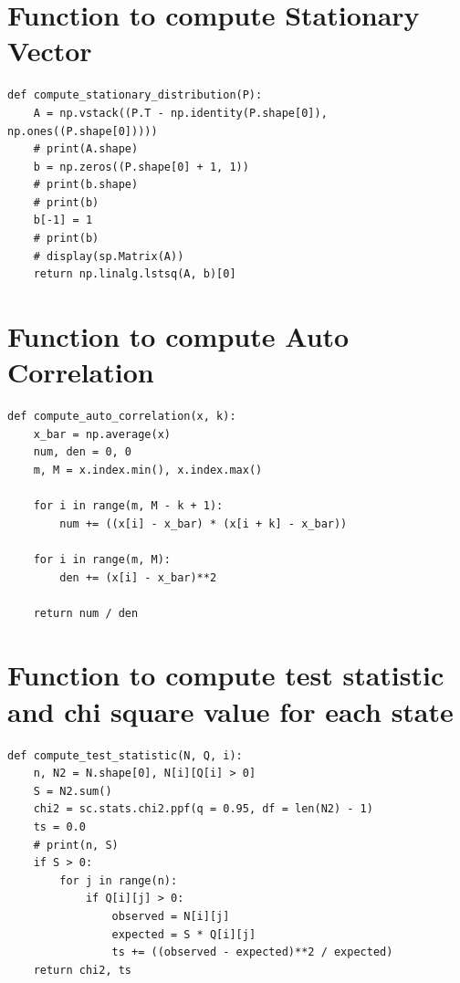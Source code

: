 \documentclass[a4paper, article, oneside, UKenglish]{memoir}
\newcommand{\0}{\mathbf{0}}
\newcommand{\1}{\mathbf{1}}
\begin{document}
\section{Function to compute Stationary Vector}
\label{sec:sv}
\begin{verbatim}
def compute_stationary_distribution(P):
    A = np.vstack((P.T - np.identity(P.shape[0]), np.ones((P.shape[0]))))
    # print(A.shape)
    b = np.zeros((P.shape[0] + 1, 1))
    # print(b.shape)
    # print(b)
    b[-1] = 1
    # print(b)
    # display(sp.Matrix(A))
    return np.linalg.lstsq(A, b)[0]
\end{verbatim}

\section{Function to compute Auto Correlation}
\label{sec:ac}
\begin{verbatim}
def compute_auto_correlation(x, k):
    x_bar = np.average(x)
    num, den = 0, 0
    m, M = x.index.min(), x.index.max()
    
    for i in range(m, M - k + 1):
        num += ((x[i] - x_bar) * (x[i + k] - x_bar))
    
    for i in range(m, M):
        den += (x[i] - x_bar)**2
    
    return num / den
\end{verbatim}

\section{Function to compute test statistic and chi square value for each state}
\label{sec:tscs}
\begin{verbatim}
def compute_test_statistic(N, Q, i):
    n, N2 = N.shape[0], N[i][Q[i] > 0]
    S = N2.sum()
    chi2 = sc.stats.chi2.ppf(q = 0.95, df = len(N2) - 1)
    ts = 0.0
    # print(n, S)
    if S > 0:
        for j in range(n):
            if Q[i][j] > 0:
                observed = N[i][j]
                expected = S * Q[i][j]
                ts += ((observed - expected)**2 / expected)
    return chi2, ts
\end{verbatim}


\printbibliography
\end{document}
